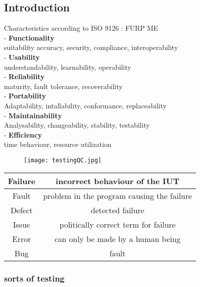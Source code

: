 \subsection{Introduction}
Characteristics according to ISO 9126 : FURP ME\\
- \textbf{Functionality}\\
 suitability accuracy, security, compliance, interoperability\\
- \textbf{Usability}\\
 understandability, learnability, operability\\
- \textbf{Reliability}\\
 maturity, fault tolerance, recoverability\\
- \textbf{Portability}\\
 Adaptability, intallability, conformance, replaceability\\
- \textbf{Maintainability}\\
 Analysability, changeability, stability, testability\\
- \textbf{Efficiency}\\
 time behaviour, resource utilization\\
 

\begin{figure}[h!]
\centering
\texttt{[image: testingQC.jpg]}
\caption{}
\label{fig:testingQC}
\end{figure}

\begin{tabular}{c|c}
	Failure  & incorrect behaviour of the IUT \\ 
	\hline Fault  & problem in the program causing the failure \\ 
	\hline Defect & detected failure \\ 
	\hline Issue & politically correct term for failure \\ 
	\hline Error & can only be made by a human being  \\ 
	\hline Bug & fault \\ 	
\end{tabular} 

\subsubsection{sorts of testing}

